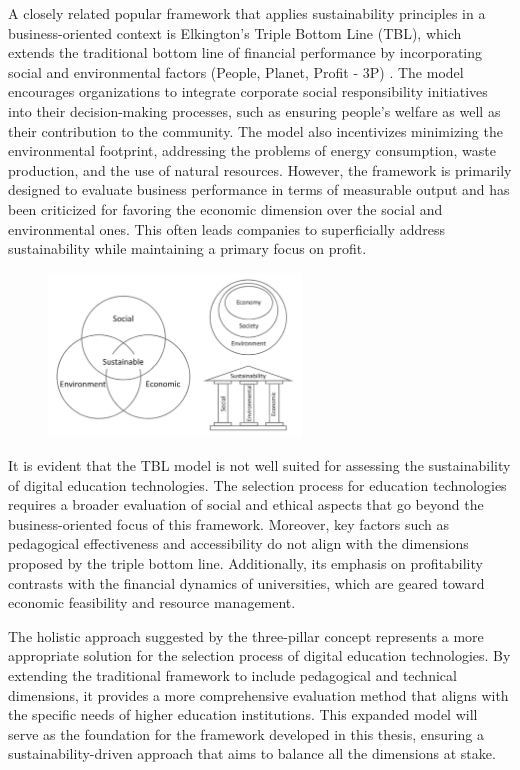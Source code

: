 A closely related popular framework that applies sustainability principles in a business-oriented context is Elkington's Triple Bottom Line (TBL), which extends the traditional bottom line of financial performance by incorporating social and environmental factors (People, Planet, Profit - 3P) \cite{correia_sustainability_2019}. The model encourages organizations to integrate corporate social responsibility initiatives into their decision-making processes, such as ensuring people's welfare as well as their contribution to the community. The model also incentivizes minimizing the environmental footprint, addressing the problems of energy consumption, waste production, and the use of natural resources. However, the framework is primarily designed to evaluate business performance in terms of measurable output and has been criticized for favoring the economic dimension over the social and environmental ones. This often leads companies to superficially address sustainability while maintaining a primary focus on profit.

\begin{figure}[ht!]
  \centering
  \includegraphics[width=0.6\textwidth]{img/three_pillars_model.png}
  \caption{}
  \label{fig:three_pillars_model}
\end{figure}

It is evident that the TBL model is not well suited for assessing the sustainability of digital education technologies. The selection process for education technologies requires a broader evaluation of social and ethical aspects that go beyond the business-oriented focus of this framework. Moreover, key factors such as pedagogical effectiveness and accessibility do not align with the dimensions proposed by the triple bottom line. Additionally, its emphasis on profitability contrasts with the financial dynamics of universities, which are geared toward economic feasibility and resource management.

The holistic approach suggested by the three-pillar concept represents a more appropriate solution for the selection process of digital education technologies. By extending the traditional framework to include pedagogical and technical dimensions, it provides a more comprehensive evaluation method that aligns with the specific needs of higher education institutions. This expanded model will serve as the foundation for the framework developed in this thesis, ensuring a sustainability-driven approach that aims to balance all the dimensions at stake.